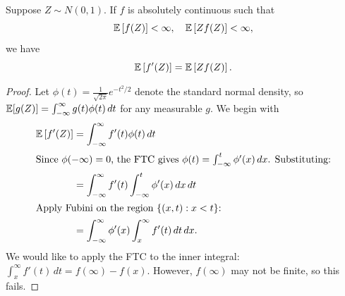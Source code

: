 \begin{lemma}
	Suppose $Z \sim N(0,1)$. If $f$ is absolutely continuous such that \[
		\mathbb{E}\left[f(Z)\right] < \infty, \quad \mathbb{E}\left[Z f(Z)\right] < \infty
	,\] we have \[
		\mathbb{E}\left[f'(Z)\right] = \mathbb{E}\left[Z f(Z)\right] 
	.\] 
\end{lemma}
\begin{proof}
	Let $\phi(t) = \frac{1}{\sqrt{2\pi}}e^{-t^2/2}$ denote the standard normal density, so $\mathbb{E}[g(Z)] = \int_{-\infty}^\infty g(t)\phi(t)\,dt$ for any measurable $g$. We begin with
	\begin{align*}
		\mathbb{E}\left[f'(Z)\right]
		&= \int_{-\infty}^{\infty} f'(t)\phi(t)\,dt \\
		\intertext{Since $\phi(-\infty) = 0$, the FTC gives $\phi(t) = \int_{-\infty}^{t} \phi'(x)\,dx$. Substituting:}
		&= \int_{-\infty}^{\infty} f'(t) \int_{-\infty}^{t} \phi'(x)\,dx\,dt \\
		\intertext{Apply Fubini on the region $\{(x,t) : x < t\}$:}
		&= \int_{-\infty}^{\infty} \phi'(x)\int_{x}^{\infty} f'(t)\,dt\, dx.
	\end{align*}
	We would like to apply the FTC to the inner integral: $\int_x^{\infty} f'(t)\,dt = f(\infty) - f(x)$. However, $f(\infty)$ may not be finite, so this fails.


\end{proof}
